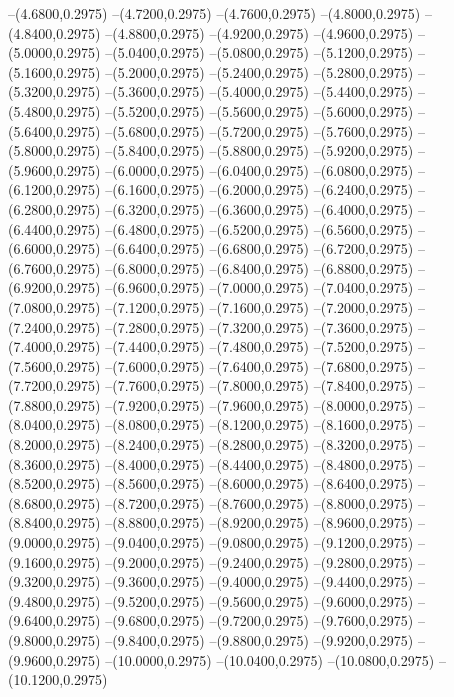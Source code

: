 {	--(4.6800,0.2975)
	--(4.7200,0.2975)
	--(4.7600,0.2975)
	--(4.8000,0.2975)
	--(4.8400,0.2975)
	--(4.8800,0.2975)
	--(4.9200,0.2975)
	--(4.9600,0.2975)
	--(5.0000,0.2975)
	--(5.0400,0.2975)
	--(5.0800,0.2975)
	--(5.1200,0.2975)
	--(5.1600,0.2975)
	--(5.2000,0.2975)
	--(5.2400,0.2975)
	--(5.2800,0.2975)
	--(5.3200,0.2975)
	--(5.3600,0.2975)
	--(5.4000,0.2975)
	--(5.4400,0.2975)
	--(5.4800,0.2975)
	--(5.5200,0.2975)
	--(5.5600,0.2975)
	--(5.6000,0.2975)
	--(5.6400,0.2975)
	--(5.6800,0.2975)
	--(5.7200,0.2975)
	--(5.7600,0.2975)
	--(5.8000,0.2975)
	--(5.8400,0.2975)
	--(5.8800,0.2975)
	--(5.9200,0.2975)
	--(5.9600,0.2975)
	--(6.0000,0.2975)
	--(6.0400,0.2975)
	--(6.0800,0.2975)
	--(6.1200,0.2975)
	--(6.1600,0.2975)
	--(6.2000,0.2975)
	--(6.2400,0.2975)
	--(6.2800,0.2975)
	--(6.3200,0.2975)
	--(6.3600,0.2975)
	--(6.4000,0.2975)
	--(6.4400,0.2975)
	--(6.4800,0.2975)
	--(6.5200,0.2975)
	--(6.5600,0.2975)
	--(6.6000,0.2975)
	--(6.6400,0.2975)
	--(6.6800,0.2975)
	--(6.7200,0.2975)
	--(6.7600,0.2975)
	--(6.8000,0.2975)
	--(6.8400,0.2975)
	--(6.8800,0.2975)
	--(6.9200,0.2975)
	--(6.9600,0.2975)
	--(7.0000,0.2975)
	--(7.0400,0.2975)
	--(7.0800,0.2975)
	--(7.1200,0.2975)
	--(7.1600,0.2975)
	--(7.2000,0.2975)
	--(7.2400,0.2975)
	--(7.2800,0.2975)
	--(7.3200,0.2975)
	--(7.3600,0.2975)
	--(7.4000,0.2975)
	--(7.4400,0.2975)
	--(7.4800,0.2975)
	--(7.5200,0.2975)
	--(7.5600,0.2975)
	--(7.6000,0.2975)
	--(7.6400,0.2975)
	--(7.6800,0.2975)
	--(7.7200,0.2975)
	--(7.7600,0.2975)
	--(7.8000,0.2975)
	--(7.8400,0.2975)
	--(7.8800,0.2975)
	--(7.9200,0.2975)
	--(7.9600,0.2975)
	--(8.0000,0.2975)
	--(8.0400,0.2975)
	--(8.0800,0.2975)
	--(8.1200,0.2975)
	--(8.1600,0.2975)
	--(8.2000,0.2975)
	--(8.2400,0.2975)
	--(8.2800,0.2975)
	--(8.3200,0.2975)
	--(8.3600,0.2975)
	--(8.4000,0.2975)
	--(8.4400,0.2975)
	--(8.4800,0.2975)
	--(8.5200,0.2975)
	--(8.5600,0.2975)
	--(8.6000,0.2975)
	--(8.6400,0.2975)
	--(8.6800,0.2975)
	--(8.7200,0.2975)
	--(8.7600,0.2975)
	--(8.8000,0.2975)
	--(8.8400,0.2975)
	--(8.8800,0.2975)
	--(8.9200,0.2975)
	--(8.9600,0.2975)
	--(9.0000,0.2975)
	--(9.0400,0.2975)
	--(9.0800,0.2975)
	--(9.1200,0.2975)
	--(9.1600,0.2975)
	--(9.2000,0.2975)
	--(9.2400,0.2975)
	--(9.2800,0.2975)
	--(9.3200,0.2975)
	--(9.3600,0.2975)
	--(9.4000,0.2975)
	--(9.4400,0.2975)
	--(9.4800,0.2975)
	--(9.5200,0.2975)
	--(9.5600,0.2975)
	--(9.6000,0.2975)
	--(9.6400,0.2975)
	--(9.6800,0.2975)
	--(9.7200,0.2975)
	--(9.7600,0.2975)
	--(9.8000,0.2975)
	--(9.8400,0.2975)
	--(9.8800,0.2975)
	--(9.9200,0.2975)
	--(9.9600,0.2975)
	--(10.0000,0.2975)
	--(10.0400,0.2975)
	--(10.0800,0.2975)
	--(10.1200,0.2975)
}
